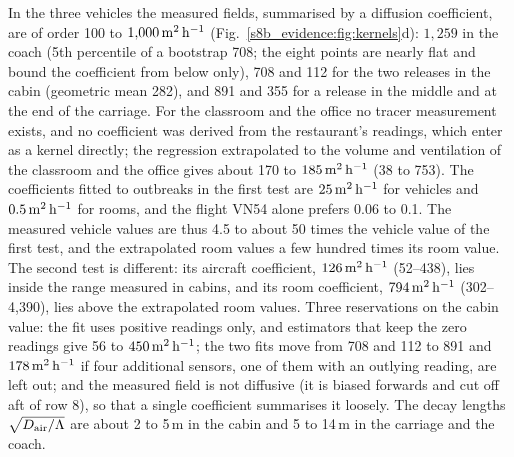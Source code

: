 In the three vehicles the measured fields, summarised by a diffusion coefficient, are of order 100 to
$1{,}000\,\mathrm{m}^2\,\mathrm{h}^{-1}$ (Fig.~\ref{s8b_evidence:fig:kernels}d): $1{,}259$ in the coach (5th percentile of a bootstrap 708;
the eight points are nearly flat and bound the coefficient from below only), 708 and 112 for the two releases
in the cabin (geometric mean 282), and 891 and 355 for a release in the middle and at the end of the carriage.
For the classroom and the office no tracer measurement exists, and no coefficient was derived from the
restaurant's readings, which enter as a kernel directly; the regression extrapolated to the volume and
ventilation of the classroom and the office gives about 170 to $185\,\mathrm{m}^2\,\mathrm{h}^{-1}$ (38 to 753). The coefficients fitted to outbreaks in the
first test are $25\,\mathrm{m}^2\,\mathrm{h}^{-1}$ for vehicles and $0.5\,\mathrm{m}^2\,\mathrm{h}^{-1}$ for rooms, and the flight VN54 alone prefers 0.06 to 0.1.
The measured vehicle values are thus 4.5 to about 50 times the vehicle value of the first test, and the
extrapolated room values a few hundred times its room value. The second test is different: its aircraft
coefficient, $126\,\mathrm{m}^2\,\mathrm{h}^{-1}$ (52--438), lies inside the range measured in cabins, and its room coefficient, $794\,\mathrm{m}^2\,\mathrm{h}^{-1}$
(302--4{,}390), lies above the extrapolated room values. Three reservations on the cabin value: the fit uses positive
readings only, and estimators that keep the zero readings give 56 to $450\,\mathrm{m}^2\,\mathrm{h}^{-1}$; the two fits move from 708
and 112 to 891 and $178\,\mathrm{m}^2\,\mathrm{h}^{-1}$ if four additional sensors, one of them with an outlying reading, are left out;
and the measured field is not diffusive (it is biased forwards and cut off aft of row 8), so that a single
coefficient summarises it loosely.
The decay lengths $\sqrt{D_{\mathrm{air}}/\Lambda}$ are about 2 to 5\,m in the cabin and 5 to 14\,m in the carriage and
the coach.

